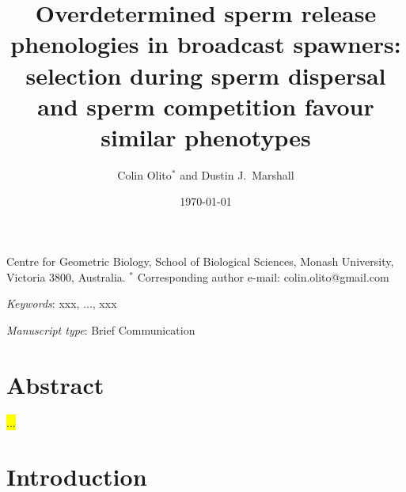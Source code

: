 \documentclass{article}
\title{Overdetermined sperm release phenologies in broadcast spawners: selection during sperm dispersal and sperm competition favour similar phenotypes}
\author{Colin Olito$^{\ast}$ and Dustin J.~Marshall}
\date{\today}
\begin{document}
\maketitle


\noindent{} Centre for Geometric Biology, School of Biological Sciences, Monash University, Victoria 3800, Australia.
\noindent{} $^\ast$ Corresponding author e-mail: colin.olito@gmail.com

\bigskip

\noindent{} \textit{Keywords}: xxx, ..., xxx

\bigskip

\noindent{} \textit{Manuscript type}: Brief Communication

\bigskip


\linenumbers
\modulolinenumbers[1]
\renewcommand\linenumberfont{\normalfont\small}


\newpage{}
\section*{Abstract}

\noindent{} \hl{...}

\section*{Introduction}

\end{document}
